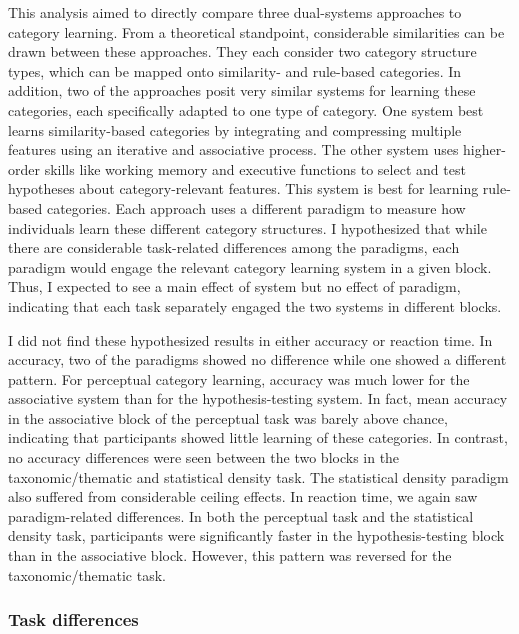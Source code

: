 \documentclass[../dissertation.tex]{subfiles}
\begin{document}
This analysis aimed to directly compare three dual-systems approaches to category learning. From a theoretical standpoint, considerable similarities can be drawn between these approaches. They each consider two category structure types, which can be mapped onto similarity- and rule-based categories. In addition, two of the approaches posit very similar systems for learning these categories, each specifically adapted to one type of category. One system best learns similarity-based categories by integrating and compressing multiple features using an iterative and associative process. The other system uses higher-order skills like working memory and executive functions to select and test hypotheses about category-relevant features. This system is best for learning rule-based categories. Each approach uses a different paradigm to measure how individuals learn these different category structures. I hypothesized that while there are considerable task-related differences among the paradigms, each paradigm would engage the relevant category learning system in a given block. Thus, I expected to see a main effect of system but no effect of paradigm, indicating that each task separately engaged the two systems in different blocks. \par
	I did not find these hypothesized results in either accuracy or reaction time. In accuracy, two of the paradigms showed no difference while one showed a different pattern. For perceptual category learning, accuracy was much lower for the associative system than for the hypothesis-testing system. In fact, mean accuracy in the associative block of the perceptual task was barely above chance, indicating that participants showed little learning of these categories. In contrast, no accuracy differences were seen between the two blocks in the taxonomic/thematic and statistical density task. The statistical density paradigm also suffered from considerable ceiling effects. In reaction time, we again saw paradigm-related differences. In both the perceptual task and the statistical density task, participants were significantly faster in the hypothesis-testing block than in the associative block. However, this pattern was reversed for the taxonomic/thematic task. \par
	
\subsubsection{Task differences}
\end{document}
